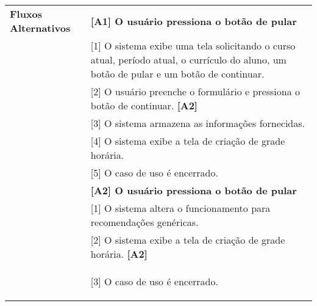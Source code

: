 \begin{longtable}{ | m{} | m{} | }
    \multirow{1}{*}{\textbf{Fluxos Alternativos}} & \textbf{[A1] O usuário pressiona o botão de pular}\tabularnewline\cline{2-2}
    & [1] O sistema exibe uma tela solicitando o curso atual, período atual, o currículo do aluno, um botão de pular e um botão de continuar.\tabularnewline\cline{2-2}
    & [2] O usuário preenche o formulário e pressiona o botão de continuar. \textbf{[A2]}\tabularnewline\cline{2-2} 
    & [3] O sistema armazena as informações fornecidas.\tabularnewline\cline{2-2}
    & [4] O sistema exibe a tela de criação de grade horária.\tabularnewline\cline{2-2}
    & [5] O caso de uso é encerrado.\tabularnewline\cline{2-2}

    & \textbf{[A2] O usuário pressiona o botão de pular}\tabularnewline\cline{2-2}
    & [1] O sistema altera o funcionamento para recomendações genéricas.\tabularnewline\cline{2-2}
    & [2] O sistema exibe a tela de criação de grade horária. \textbf{[A2]}\tabularnewline\cline{2-2} 
    & [3] O caso de uso é encerrado. %

    \label{tab:uc01}
\end{longtable}


